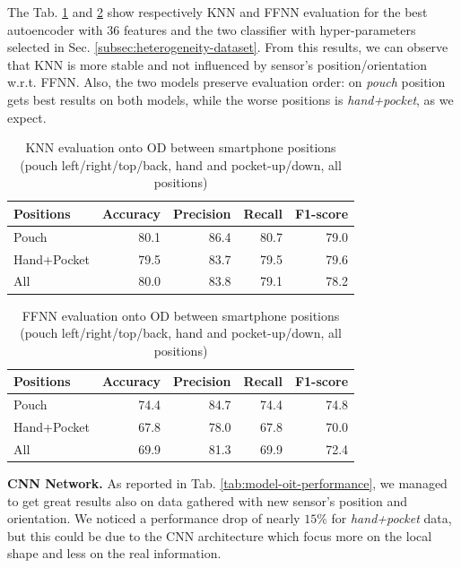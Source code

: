 The Tab. \ref{tab:knn-metrics} and \ref{tab:ffnn-metrics} show
respectively KNN and FFNN evaluation for the best autoencoder with
$36$ features and the two classifier with hyper-parameters selected in
Sec. \ref{subsec:heterogeneity-dataset}. From this results, we can
observe that KNN is more stable and not influenced by sensor's
position/orientation w.r.t. FFNN. Also, the two models preserve evaluation order: on \textit{pouch} position gets best results on both
models, while the worse positions is \textit{hand+pocket}, as we
expect.

\begin{table}[h]
  \centering
  \begin{tabular}{lrrrr}
    \hline
    Positions & Accuracy & Precision & Recall & F1-score \\
    \hline
    Pouch & 80.1 & 86.4 & 80.7 & 79.0 \\
    Hand+Pocket & 79.5 & 83.7 & 79.5 & 79.6 \\
    All & 80.0 & 83.8 & 79.1 & 78.2 \\
    \hline
  \end{tabular}
  \caption{KNN evaluation onto OD between smartphone positions (pouch
    left/right/top/back, hand and pocket-up/down, all positions)}
  \label{tab:knn-metrics}
\end{table}

\begin{table}[h]
  \centering
  \begin{tabular}{lrrrr}
    \hline
    Positions & Accuracy & Precision & Recall & F1-score \\
    \hline
    Pouch & 74.4 & 84.7 & 74.4 & 74.8 \\
    Hand+Pocket & 67.8 & 78.0 & 67.8 & 70.0 \\
    All & 69.9 & 81.3 & 69.9 & 72.4 \\
    \hline
  \end{tabular}
  \caption{FFNN evaluation onto OD between smartphone positions (pouch
    left/right/top/back, hand and pocket-up/down, all positions)}
  \label{tab:ffnn-metrics}
\end{table}

\textbf{CNN Network.}  As reported in
Tab. \ref{tab:model-oit-performance}, we managed to get great results
also on data gathered with new sensor's position and orientation. We
noticed a performance drop of nearly $15\%$ for \textit{hand+pocket}
data, but this could be due to the CNN architecture which focus more
on the local shape and less on the real information. 

